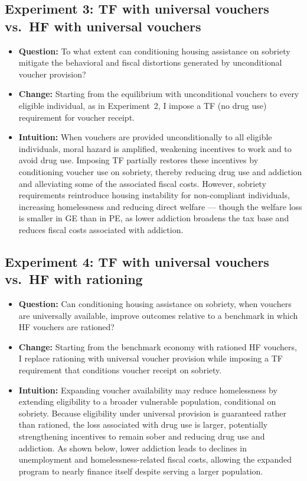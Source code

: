 \documentclass[parskip=full]{article}
\theoremstyle{plain}
\theoremstyle{definition}
\theoremstyle{remark}
\begin{document}
\subsection{Experiment 3: TF with universal vouchers vs.\ HF with universal vouchers}

\begin{itemize}
\item \textbf{Question:} To what extent can conditioning housing assistance on sobriety mitigate the behavioral and fiscal distortions generated by unconditional voucher provision?

\item \textbf{Change:} Starting from the equilibrium with unconditional vouchers to every eligible individual, as in Experiment~2, I impose a TF (no drug use) requirement for voucher receipt.

\item \textbf{Intuition:} When vouchers are provided unconditionally to all eligible individuals, moral hazard is amplified, weakening incentives to work and to avoid drug use. Imposing TF partially restores these incentives by conditioning voucher use on sobriety, thereby reducing drug use and addiction and alleviating some of
the associated fiscal costs. However, sobriety requirements reintroduce housing instability for non-compliant individuals, increasing homelessness and reducing direct welfare — though the welfare loss is smaller in GE than in PE, as lower addiction broadens the tax base and reduces fiscal costs associated with addiction.
\end{itemize}

\subsection{Experiment 4: TF with universal vouchers vs.\ HF with rationing}

\begin{itemize}
\item \textbf{Question:} Can conditioning housing assistance on sobriety, when vouchers are universally available, improve outcomes relative to a benchmark in which HF vouchers are rationed?

\item \textbf{Change:} Starting from the benchmark economy with rationed HF vouchers, I replace rationing with universal voucher provision while imposing a TF requirement that conditions voucher receipt on sobriety.

\item \textbf{Intuition:} Expanding voucher availability may reduce homelessness by extending eligibility to a broader vulnerable population, conditional on sobriety. Because eligibility under universal provision is guaranteed rather than rationed, the loss associated with drug use is larger, potentially strengthening incentives to remain sober and reducing drug use and addiction. As shown below, lower addiction leads to declines in unemployment and homelessness-related fiscal costs, allowing the expanded program to nearly finance itself despite serving a larger population.
\end{itemize}
\end{document}
